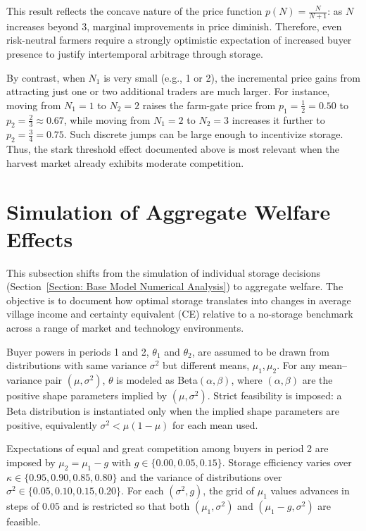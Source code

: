 This result reflects the concave nature of the price function $p(N) = \tfrac{N}{N+1}$: as $N$ increases beyond 3, marginal improvements in price diminish. Therefore, even risk-neutral farmers require a strongly optimistic expectation of increased buyer presence to justify intertemporal arbitrage through storage. 

By contrast, when $N_1$ is very small (e.g., 1 or 2), the incremental price gains from attracting just one or two additional traders are much larger. For instance, moving from $N_1=1$ to $N_2=2$ raises the farm-gate price from $p_1=\tfrac{1}{2}=0.50$ to $p_2=\tfrac{2}{3}\approx 0.67$, while moving from $N_1=2$ to $N_2=3$ increases it further to $p_2=\tfrac{3}{4}=0.75$. Such discrete jumps can be large enough to incentivize storage. Thus, the stark threshold effect documented above is most relevant when the harvest market already exhibits moderate competition.







\section{Simulation of Aggregate Welfare Effects}\label{subsec:agg_welfare}
\noindent
This subsection shifts from the simulation of individual storage decisions (Section~\ref{Section: Base Model Numerical Analysis}) to aggregate welfare. The objective is to document how optimal storage translates into changes in average village income and certainty equivalent (CE) relative to a no-storage benchmark across a range of market and technology environments.

Buyer powers in periods 1 and 2, $\theta_1$ and $\theta_2$, are assumed to be drawn from distributions with same variance $\sigma^2$ but different means, $\mu_1,\mu_2$. For any mean--variance pair $(\mu,\sigma^2)$, $\theta$ is modeled as Beta$(\alpha,\beta)$, where $(\alpha,\beta)$ are the positive shape parameters implied by $(\mu,\sigma^2)$. Strict feasibility is imposed: a Beta distribution is instantiated only when the implied shape parameters are positive, equivalently $\sigma^2<\mu(1-\mu)$ for each mean used. 


Expectations of equal and great competition among buyers in period 2 are imposed by $\mu_2=\mu_1-g$ with $g\in\{0.00,0.05,0.15\}$. Storage efficiency varies over $\kappa\in\{0.95,0.90,0.85,0.80\}$ and the variance of distributions over $\sigma^2\in\{0.05,0.10,0.15,0.20\}$. For each $(\sigma^2,g)$, the grid of $\mu_1$ values advances in steps of $0.05$ and is restricted so that both $(\mu_1,\sigma^2)$ and $(\mu_1-g,\sigma^2)$ are feasible.

